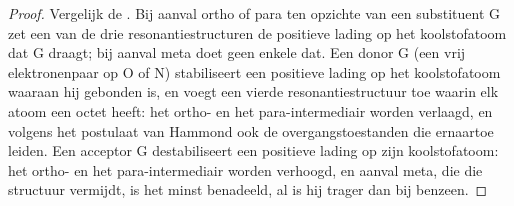 \begin{proof}
Vergelijk de . Bij aanval ortho of para ten opzichte van een substituent G zet een van de
drie resonantiestructuren de positieve lading op het koolstofatoom dat G draagt; bij aanval meta
doet geen enkele dat. Een donor G (een vrij elektronenpaar op O of N) stabiliseert een positieve lading op het koolstofatoom waaraan hij
gebonden is, en voegt een vierde resonantiestructuur toe waarin elk atoom een octet heeft:
het ortho- en het para-intermediair worden verlaagd, en volgens het postulaat van Hammond ook de overgangstoestanden
die ernaartoe leiden. Een acceptor G destabiliseert een positieve lading op zijn koolstofatoom: het ortho- en het para-intermediair
worden verhoogd, en aanval meta, die die structuur vermijdt, is het minst
benadeeld, al is hij trager dan bij benzeen.
\end{proof}

